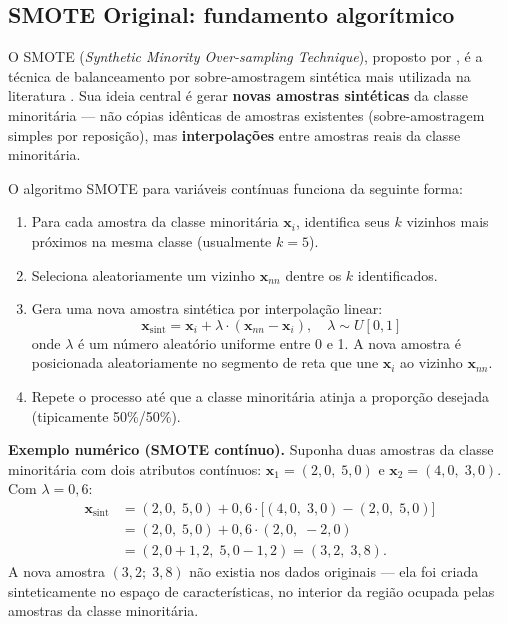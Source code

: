 \documentclass[
    12pt,
    a4paper,
    oneside,
    english,
    french,
    spanish,
    brazil
    ]{abntex2}
\newcommand{\novo}[1]{\textcolor{corNova}{#1}}
\begin{document}
\subsection*{SMOTE Original: fundamento algorítmico}

\novo{O SMOTE (\textit{Synthetic Minority Over-sampling Technique}), proposto por \citeonline{chawla2002smote}, é a técnica de balanceamento por sobre-amostragem sintética mais utilizada na literatura \cite{fernandez2018smote}. Sua ideia central é gerar \textbf{novas amostras sintéticas} da classe minoritária --- não cópias idênticas de amostras existentes (sobre-amostragem simples por reposição), mas \textbf{interpolações} entre amostras reais da classe minoritária.}

\novo{O algoritmo SMOTE para variáveis contínuas funciona da seguinte forma:}
\begin{enumerate}
  \item \novo{Para cada amostra da classe minoritária $\mathbf{x}_i$, identifica seus $k$ vizinhos mais próximos na mesma classe (usualmente $k = 5$).}
  \item \novo{Seleciona aleatoriamente um vizinho $\mathbf{x}_{nn}$ dentre os $k$ identificados.}
  \item \novo{Gera uma nova amostra sintética por interpolação linear:
  \begin{equation}
    \mathbf{x}_{\text{sint}} = \mathbf{x}_i + \lambda \cdot (\mathbf{x}_{nn} - \mathbf{x}_i), \quad \lambda \sim U[0, 1]
    \label{eq:smote}
  \end{equation}
  onde $\lambda$ é um número aleatório uniforme entre 0 e 1. A nova amostra é posicionada aleatoriamente no segmento de reta que une $\mathbf{x}_i$ ao vizinho $\mathbf{x}_{nn}$.}
  \item \novo{Repete o processo até que a classe minoritária atinja a proporção desejada (tipicamente 50\%/50\%).}
\end{enumerate}

\novo{\textbf{Exemplo numérico (SMOTE contínuo).} Suponha duas amostras da classe minoritária com dois atributos contínuos: $\mathbf{x}_1 = (2{,}0,\; 5{,}0)$ e $\mathbf{x}_2 = (4{,}0,\; 3{,}0)$. Com $\lambda = 0{,}6$:
\begin{align*}
  \mathbf{x}_{\text{sint}} &= (2{,}0,\; 5{,}0) + 0{,}6 \cdot \big[(4{,}0,\; 3{,}0) - (2{,}0,\; 5{,}0)\big] \\
                           &= (2{,}0,\; 5{,}0) + 0{,}6 \cdot (2{,}0,\; -2{,}0) \\
                           &= (2{,}0 + 1{,}2,\; 5{,}0 - 1{,}2) = (3{,}2,\; 3{,}8).
\end{align*}
A nova amostra $(3{,}2;\; 3{,}8)$ não existia nos dados originais --- ela foi criada sinteticamente no espaço de características, no interior da região ocupada pelas amostras da classe minoritária.}
\end{document}
